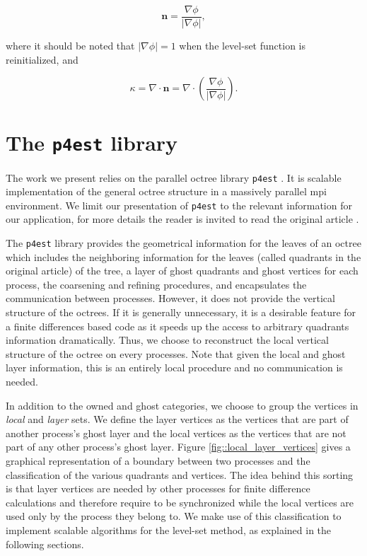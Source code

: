 \documentclass{elsarticle}
\begin{document}
\begin{equation*}
\mathbf{n} = \frac{\nabla \phi}{\lvert \nabla \phi \rvert},
\end{equation*}

where it should be noted that $\lvert \nabla \phi \rvert = 1$ when the level-set function is reinitialized, and

\begin{equation*}
\kappa = \nabla \cdot \mathbf{n} =  \nabla \cdot \left( \frac{\nabla \phi}{\lvert \nabla \phi \rvert} \right).
\end{equation*}


\section{The \texttt{p4est} library}

The work we present relies on the parallel octree library \texttt{p4est} \cite{burstedded:2011:p4est}. It is scalable implementation of the general octree structure in a massively parallel mpi environment. We limit our presentation of \texttt{p4est} to the relevant information for our application, for more details the reader is invited to read the original article \cite{burstedded:2011:p4est}.

The \texttt{p4est} library provides the geometrical information for the leaves of an octree which includes the neighboring information for the leaves (called quadrants in the original article) of the tree, a layer of ghost quadrants and ghost vertices for each process, the coarsening and refining procedures, and encapsulates the communication between processes. However, it does not provide the vertical structure of the octrees. If it is generally unnecessary, it is a desirable feature for a finite differences based code as it speeds up the access to arbitrary quadrants information dramatically. Thus, we choose to reconstruct the local vertical structure of the octree on every processes. Note that given the local and ghost layer information, this is an entirely local procedure and no communication is needed.

In addition to the owned and ghost categories, we choose to group the vertices in \textit{local} and \textit{layer} sets. We define the layer vertices as the vertices that are part of another process's ghost layer and the local vertices as the vertices that are not part of any other process's ghost layer. Figure \ref{fig::local_layer_vertices} gives a graphical representation of a boundary between two processes and the classification of the various quadrants and vertices. The idea behind this sorting is that layer vertices are needed by other processes for finite difference calculations and therefore require to be synchronized while the local vertices are used only by the process they belong to. We make use of this classification to implement scalable algorithms for the level-set method, as explained in the following sections.
\end{document}
